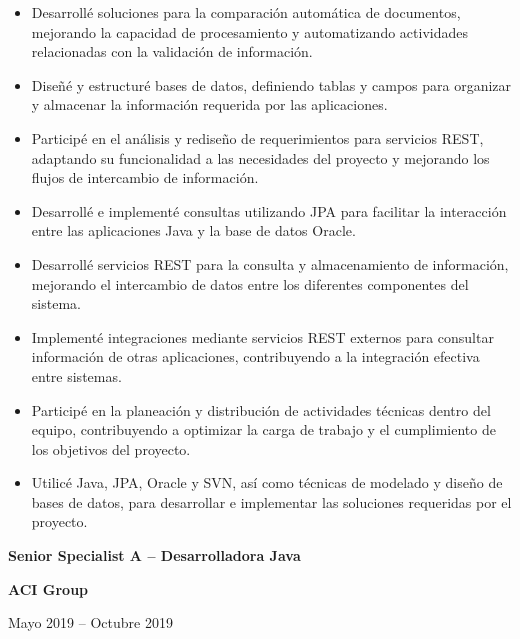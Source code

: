\documentclass[10pt,letterpaper]{article}
\newcommand{\jobtitle}[1]{
    {\bfseries #1}
}
\newcommand{\company}[1]{
    {\bfseries\color{DarkGray} #1}
}
\newcommand{\jobdate}[1]{
    {\color{MediumGray} #1}
}
\begin{document}
\begin{itemize}

\item Desarrollé soluciones para la comparación automática de documentos, mejorando la capacidad de procesamiento y automatizando actividades relacionadas con la validación de información.

\item Diseñé y estructuré bases de datos, definiendo tablas y campos para organizar y almacenar la información requerida por las aplicaciones.

\item Participé en el análisis y rediseño de requerimientos para servicios REST, adaptando su funcionalidad a las necesidades del proyecto y mejorando los flujos de intercambio de información.

\item Desarrollé e implementé consultas utilizando JPA para facilitar la interacción entre las aplicaciones Java y la base de datos Oracle.

\item Desarrollé servicios REST para la consulta y almacenamiento de información, mejorando el intercambio de datos entre los diferentes componentes del sistema.

\item Implementé integraciones mediante servicios REST externos para consultar información de otras aplicaciones, contribuyendo a la integración efectiva entre sistemas.

\item Participé en la planeación y distribución de actividades técnicas dentro del equipo, contribuyendo a optimizar la carga de trabajo y el cumplimiento de los objetivos del proyecto.

\item Utilicé Java, JPA, Oracle y SVN, así como técnicas de modelado y diseño de bases de datos, para desarrollar e implementar las soluciones requeridas por el proyecto.

\end{itemize}

\jobtitle{Senior Specialist A -- Desarrolladora Java} \textbar{}
\company{ACI Group}
\hfill \textbar{}
\jobdate{Mayo 2019 -- Octubre 2019}
\end{document}
